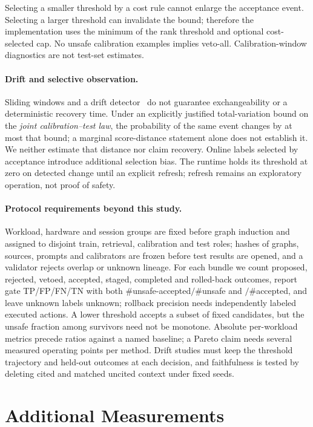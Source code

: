 Selecting a smaller threshold by a cost rule cannot enlarge the acceptance event. Selecting a larger threshold can invalidate the bound; therefore the implementation uses the minimum of the rank threshold and optional cost-selected cap. No unsafe calibration examples implies veto-all. Calibration-window diagnostics are not test-set estimates.

\paragraph{Drift and selective observation.}
Sliding windows and a drift detector~\cite{Bifet2007ADWIN} do not guarantee exchangeability or a deterministic recovery time. Under an explicitly justified total-variation bound on the \emph{joint calibration--test law}, the probability of the same event changes by at most that bound; a marginal score-distance statement alone does not establish it. We neither estimate that distance nor claim recovery. Online labels selected by acceptance introduce additional selection bias. The runtime holds its threshold at zero on detected change until an explicit refresh; refresh remains an exploratory operation, not proof of safety.

\paragraph{Protocol requirements beyond this study.}
Workload, hardware and session groups are fixed before graph induction and assigned to disjoint train, retrieval, calibration and test roles; hashes of graphs, sources, prompts and calibrators are frozen before test results are opened, and a validator rejects overlap or unknown lineage. For each bundle we count proposed, rejected, vetoed, accepted, staged, completed and rolled-back outcomes, report gate TP/FP/FN/TN with both $\#$unsafe-accepted$/\#$unsafe and $/\#$accepted, and leave unknown labels unknown; rollback precision needs independently labeled executed actions. A lower threshold accepts a subset of fixed candidates, but the unsafe fraction among survivors need not be monotone. Absolute per-workload metrics precede ratios against a named baseline; a Pareto claim needs several measured operating points per method. Drift studies must keep the threshold trajectory and held-out outcomes at each decision, and faithfulness is tested by deleting cited and matched uncited context under fixed seeds.

\section{Additional Measurements}
\label{app:measurements}

